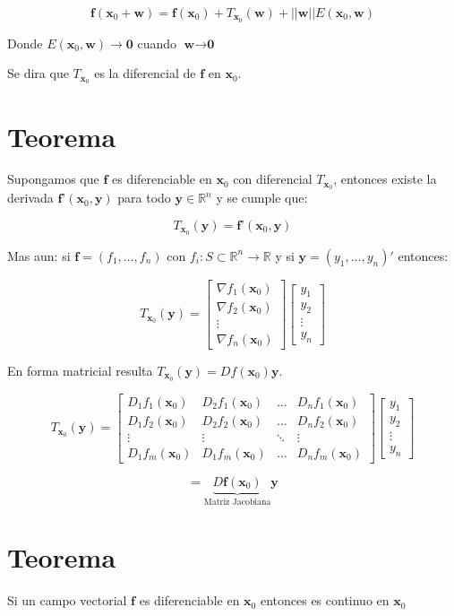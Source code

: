 \documentclass[12pt]{article}
\newcommand{\teorema}{\section{Teorema}}
\newcommand{\Rn}[1]{\mathbb{R}^{#1}}
\newcommand{\vecti}[2]{\textbf{#1}_{#2}}
\newcommand{\xo}{\vecti{x}{0}}
\newcommand{\y}{\textbf{y}}
\newcommand{\f}{\textbf{f}}
\newcommand{\fd}{\textbf{f'}}
\newcommand{\R}{\mathbb{R}}
\newcommand{\tends}{\rightarrow}
\begin{document}
	$$ \f (\xo + \textbf{w}) = \f (\xo) + T_{\xo} (\textbf{w}) + ||\textbf{w}||E(\xo,\textbf{w})$$
	
	Donde $E(\xo,\textbf{w}) \tends \textbf{0}$ cuando $\textbf{w} \tends \textbf{0}$
	
	Se dira que $T_{\xo}$ es la diferencial de $\f$ en $\xo$.
	
	\teorema
	
	Supongamos que $\f$ es diferenciable en $\xo$ con diferencial $T_{\xo}$, entonces existe la derivada $\fd(\xo,\y)$ para todo $\y \in \Rn{n}$ y se cumple que:
	
	$$ T_{\xo}(\y) = \fd(\xo,\y) $$
	
	Mas aun: si $\f = (f_1,\dots,f_n)$ con $f_i:S \subset \Rn{n} \tends \R$ y si $\y = (y_1,\dots,y_n)'$ entonces:
	
	$$ T_{\xo} (\y) = \begin{bmatrix}
		\nabla f_1(\xo) \\ \nabla f_2 (\xo) \\ \vdots \\ \nabla f_n(\xo)
	\end{bmatrix} \begin{bmatrix}
		y_1 \\
		y_2 \\
		\vdots \\
		y_n
	\end{bmatrix} $$
	
	En forma matricial resulta $T_{\xo}(\y) = Df(\xo)\y$.
	
	$$ T_{\xo}(\y) = \begin{bmatrix}
		D_1f_1(\xo) & D_2f_1(\xo) & \dots & D_nf_1(\xo) \\
		D_1f_2(\xo) & D_2f_2(\xo) & \dots & D_nf_2(\xo) \\
		\vdots & \vdots & \ddots & \vdots \\
		D_1f_m(\xo) & D_1f_m(\xo) & \dots & D_nf_m(\xo)
	\end{bmatrix} \begin{bmatrix}
	y_1 \\
	y_2 \\
	\vdots \\
	y_n
	\end{bmatrix}$$

	$$ = \underbrace{D\f (\xo)}_\text{Matriz Jacobiana}\y $$
	
	\teorema
	
	Si un campo vectorial $\f$ es diferenciable en $\xo$ entonces es continuo en $\xo$
	
\end{document}
